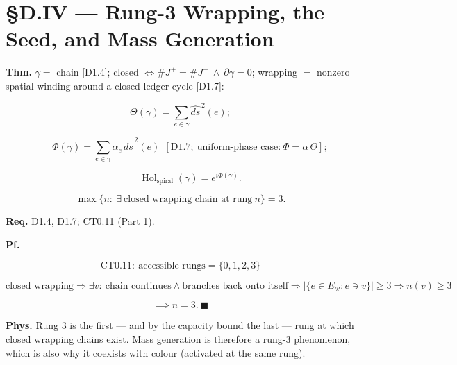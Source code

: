 \section[§D.IV — Rung-3 Wrapping, the Seed, and Mass Generation]{\texorpdfstring{§D.IV — Rung-3 Wrapping, the Seed, and Mass Generation}{SD.IV - Rung-3 Wrapping, the Seed, and Mass Generation}}

\begin{theorem}\label{tag:EW-17}
\textbf{Thm.} $\gamma=$ chain [D1.4]; closed $\iff\#J^+=\#J^-\ \wedge\ \partial\gamma=0$; wrapping $=$ nonzero spatial winding around a closed ledger cycle [D1.7]:

\[
\Theta(\gamma)=\sum_{e\in\gamma}\widehat{ds}^{\,2}(e);
\]

\[
\qquad \Phi(\gamma)=\sum_{e\in\gamma}\alpha_e\,\widehat{ds}^{\,2}(e)\ \ [\mathrm{D1.7};\ \text{uniform-phase case:}\ \Phi=\alpha\,\Theta];
\]

\[
\qquad \operatorname{Hol}_{\mathrm{spiral}}(\gamma)=e^{i\Phi(\gamma)} .
\]

\[
\max\{n:\ \exists\ \text{closed wrapping chain at rung}\ n\}=3 .
\]

\textbf{Req.} D1.4, D1.7; CT0.11 (Part 1).

\textbf{Pf.}

\[
\mathrm{CT0.11}:\ \text{accessible rungs}=\{0,1,2,3\}
\]

\[
\text{closed wrapping}\Rightarrow\exists v:\ \text{chain continues}\wedge\text{branches back onto itself}\Rightarrow\bigl|\{e\in E_{\mathcal R}:e\ni v\}\bigr|\ge3\Rightarrow n(v)\ge3
\]

\[
\implies n=3.\ \blacksquare
\]

\textbf{Phys.} Rung 3 is the first — and by the capacity bound the last — rung at which closed wrapping chains exist. Mass generation is therefore a rung-3 phenomenon, which is also why it coexists with colour (activated at the same rung).

\end{theorem}

